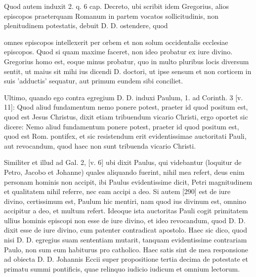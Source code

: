 Quod autem induxit 2. q. 6 cap. Decreto, ubi scribit idem Gregorius, alios episcopos praeterquam Romanum in partem vocatos sollicitudinis, non plenitudinem potestatis, debuit D. D. ostendere, quod

omnes episcopos intellexerit per orbem et non solum occidentalis ecclesiae episcopos. Quod si quam maxime faceret, non ideo probatur ex iure divino. Gregorius homo est, eoque minus probatur, quo in multo pluribus locis diversum sentit, ut maius sit mihi ius dicendi D. doctori, ut ipse sensum et non corticem in suis 'adductis' sequatur, aut primum eundem sibi conciliet.

Ultimo, quando ego contra egregium D. D. induxi Paulum, 1. ad Corinth. 3 [v. 11]: Quod aliud fundamentum nemo ponere potest, praeter id quod positum est, quod est Jesus Christus, dixit etiam tribuendum vicario Christi, ergo oportet sic dicere: Nemo aliud fundamentum ponere potest, praeter id quod positum est, quod est Rom. pontifex, et sic resistendum erit evidentissimae auctoritati Pauli, aut revocandum, quod haec non sunt tribuenda vicario Christi.

Similiter et illud ad Gal. 2, [v. 6] ubi dixit Paulus, qui videbantur (loquitur de Petro, Jacobo et Johanne) quales aliquando fuerint, nihil mea refert, deus enim personam hominis non accipit, ibi Paulus evidentissime dicit, Petri magnitudinem et qualitatem nihil referre, nec eam accipi a deo. Si autem [290] est de iure divino, certissimum est, Paulum hic mentiri, nam quod ius divinum est, omnino accipitur a deo, et multum refert. Ideoque ista auctoritas Pauli cogit primitatem ullius hominis episcopi non esse de iure divino, et ideo revocandum, quod D. D. dixit esse de iure divino, cum patenter contradicat apostolo. Haec sic dico, quod nisi D. D. egregius suam sententiam mutarit, tanquam evidentissime contrariam Paulo, non sum eum habiturus pro catholico. Haec satis sint de mea responsione ad obiecta D. D. Johannis Eccii super propositione tertia decima de potestate et primatu summi pontificis, quae relinquo iudicio iudicum et omnium lectorum.

